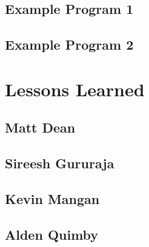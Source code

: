 \documentclass[oneside]{book}
\begin{document}
\section{Example Program 1}

\section{Example Program 2}


\chapter{Lessons Learned}

\section{Matt Dean}

\section{Sireesh Gururaja}

\section{Kevin Mangan}

\section{Alden Quimby}
\end{document}
